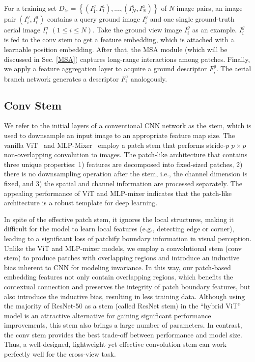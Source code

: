 \documentclass[sn-basic,iicol]{sn-jnl}
\theoremstyle{thmstyletwo}\newtheorem{example}{Example}\newtheorem{remark}{Remark}
\theoremstyle{thmstylethree}\newtheorem{definition}{Definition}
\begin{document}
For a training set ${D_{tr}}=\left\{\left(I^{g}_{1}, I^{a}_{1}\right), \ldots,\left(I^{g}_{N}, I^{a}_{N}\right)\right\}$ of $N$ image pairs, an image pair $\left(I^{g}_{i}, I^{a}_{i}\right)$ contains a query ground image $I^{g}_{i}$ and one single ground-truth aerial image $ I^{a}_{i}$ $\left(1 \leq i \leq N\right)$.
Take the ground view image $I^{g}_{i}$ as an example. $I^{g}_{i}$ is fed to the conv stem to get a feature embedding, which is attached with a learnable position embedding. After that, the MSA module (which will be discussed in Sec. \ref{MSA}) captures long-range interactions among patches. Finally, we apply a feature aggregation layer to acquire a ground descriptor $F^{g}_{i}$. The aerial branch network generates a descriptor $F^{a}_{i}$ analogously.

\subsection{Conv Stem}\label{conv stem}

We refer to the initial layers of a conventional CNN network as the stem, which is used to downsample an input image to an appropriate feature map size. The vanilla ViT~\citep{ViT2021} and MLP-Mixer~\citep{MLP-Mixer2021} employ a patch stem that performs stride-$p$ $p\times{p}$ non-overlapping convolution to images. The patch-like architecture that contains three unique properties: 1) features are decomposed into fixed-sized patches, 2) there is no downsampling operation after the stem, i.e., the channel dimension is fixed, and 3) the spatial and channel information are processed separately. The appealing performance of ViT and MLP-mixer indicates that the patch-like architecture is a robust template for deep learning. 

In spite of the effective patch stem, it ignores the local structures, making it difficult for the model to learn local features (e.g., detecting edge or corner), leading to a significant loss of patchify boundary information in visual perception. 
Unlike the ViT and MLP-mixer models, we employ a convolutional stem (conv stem) to produce patches with overlapping regions and introduce an inductive bias inherent to CNN for modeling invariance. In this way, our patch-based embedding features not only contain overlapping regions, which benefits the contextual connection and preserves the integrity of patch boundary features, but also introduce the inductive bias, resulting in less training data. Although using the majority of ResNet-50 as a stem (called ResNet stem) in the “hybrid ViT” model is an attractive alternative for gaining significant performance improvements, this stem also brings a large number of parameters. In contrast, the conv stem provides the best trade-off between performance and model size. Thus, a well-designed, lightweight yet effective convolution stem can work perfectly well for the cross-view task.
\end{document}

